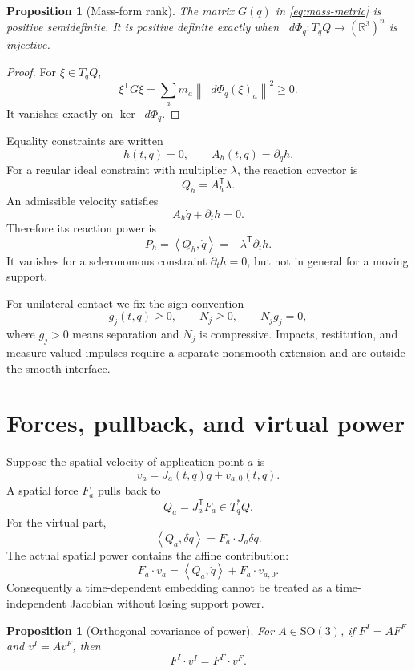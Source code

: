\documentclass[11pt,a4paper]{article}
\theoremstyle{definition}
\theoremstyle{plain}
\newtheorem{proposition}[definition]{Proposition}
\theoremstyle{remark}
\newcommand{\R}{\mathbb{R}}
\newcommand{\dd}{\mathop{}\!d}
\newcommand{\norm}[1]{\left\lVert #1\right\rVert}
\newcommand{\pair}[2]{\left\langle #1,#2\right\rangle}
\newcommand{\SO}{\mathrm{SO}}
\begin{document}
\begin{proposition}[Mass-form rank]
The matrix \(G(q)\) in \cref{eq:mass-metric} is positive
semidefinite. It is positive definite exactly when
\(\dd\Phi_q:T_qQ\to(\R^3)^n\) is injective.
\end{proposition}

\begin{proof}
For \(\xi\in T_qQ\),
\[
\xi^{\mathsf T}G\xi
=\sum_a m_a\norm{\dd\Phi_q(\xi)_a}^2\ge0.
\]
It vanishes exactly on \(\ker\dd\Phi_q\).
\end{proof}

Equality constraints are written
\[
h(t,q)=0,\qquad A_h(t,q)=\partial_qh.
\]
For a regular ideal constraint with multiplier \(\lambda\), the
reaction covector is
\[
Q_h=A_h^{\mathsf T}\lambda.
\]
An admissible velocity satisfies
\begin{equation}\label{eq:rheo-velocity}
A_h\dot q+\partial_t h=0.
\end{equation}
Therefore its reaction power is
\begin{equation}\label{eq:rheo-power}
P_h=\pair{Q_h}{\dot q}
=-\lambda^{\mathsf T}\partial_t h.
\end{equation}
It vanishes for a scleronomous constraint
\(\partial_t h=0\), but not in general for a moving support.

For unilateral contact we fix the sign convention
\begin{equation}\label{eq:complementarity}
g_j(t,q)\ge0,\qquad N_j\ge0,\qquad N_jg_j=0,
\end{equation}
where \(g_j>0\) means separation and \(N_j\) is compressive.
Impacts, restitution, and measure-valued impulses require a separate
nonsmooth extension and are outside the smooth interface.

\section{Forces, pullback, and virtual power}

Suppose the spatial velocity of application point \(a\) is
\[
v_a=J_a(t,q)\dot q+v_{a,0}(t,q).
\]
A spatial force \(F_a\) pulls back to
\[
Q_a=J_a^{\mathsf T}F_a\in T_q^*Q.
\]
For the virtual part,
\[
\pair{Q_a}{\delta q}=F_a\cdot J_a\delta q.
\]
The actual spatial power contains the affine contribution:
\[
F_a\cdot v_a
=\pair{Q_a}{\dot q}+F_a\cdot v_{a,0}.
\]
Consequently a time-dependent embedding cannot be treated as a
time-independent Jacobian without losing support power.

\begin{proposition}[Orthogonal covariance of power]
For \(A\in\SO(3)\), if \(F^I=AF^F\) and \(v^I=Av^F\), then
\[
F^I\cdot v^I=F^F\cdot v^F.
\]
\end{proposition}
\end{document}
